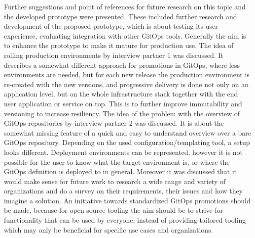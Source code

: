 Further suggestions and point of references for future research on this topic
and the developed prototype were presented.
These included
further research and development of the proposed prototype,
which is about testing its user experience, evaluating integration with
other GitOps tools. Generally the aim is to enhance the prototype
to make it mature for production use.
The idea of rolling production environments by interview partner 1 was discussed.
It describes a somewhat different approach for promotions in GitOps,
where less environments are needed, but for each new release the 
production environment is re-created with the new versions, and
progressive delivery is done not only on an application level, but on the whole
infrastructure stack together with the end user application or service on top.
This is to further improve immutability and versioning to increase resiliency.
The idea of the problem with the overview of GitOps repositories by interview partner 2
was discussed.
It is about the somewhat missing feature of a quick and easy to understand overview over a bare GitOps repository.
Depending on the used configuration/templating tool, a setup looks different.
Deployment environments can be represented, however it is not possible for the user
to know what the target environment is, or where the GitOps definition is deployed to in general.
Moreover it was discussed that it would make sense for future work
to research a wide range and variety of organizations and do a survey on
their requirements, their issues and how they imagine a solution.
An initiative towards standardized GitOps promotions should be made,
because for open-source tooling the aim should be to strive for functionality
that can be used by everyone,
instead of providing tailored tooling which may only be beneficial for specific use cases
and organizations.



























